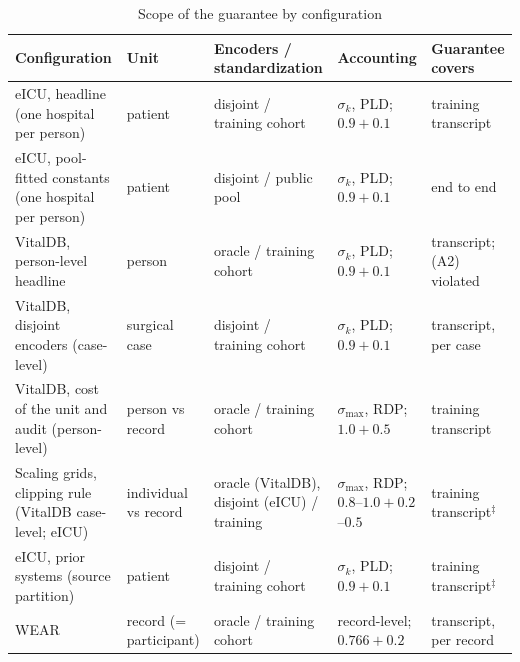 \begin{table}[!t]
\centering
\caption{Scope of the guarantee by configuration}
\label{tab:scope}
\footnotesize
\setlength{\tabcolsep}{4pt}
\begin{tabular}{>{\raggedright\arraybackslash}p{4.8cm}>{\raggedright\arraybackslash}p{2.3cm}>{\raggedright\arraybackslash}p{3.6cm}>{\raggedright\arraybackslash}p{3.3cm}>{\raggedright\arraybackslash}p{2.7cm}}
\toprule
Configuration & Unit & Encoders / standardization & Accounting & Guarantee covers \\
\midrule
eICU, headline (one hospital per person) & patient & disjoint / training cohort & $\sigma_k$, PLD; $0.9 + 0.1$ & training transcript \\
eICU, pool-fitted constants (one hospital per person) & patient & disjoint / public pool & $\sigma_k$, PLD; $0.9 + 0.1$ & end to end \\
VitalDB, person-level headline & person & oracle / training cohort & $\sigma_k$, PLD; $0.9 + 0.1$ & transcript; (A2) violated \\
VitalDB, disjoint encoders (case-level) & surgical case & disjoint / training cohort & $\sigma_k$, PLD; $0.9 + 0.1$ & transcript, per case \\
VitalDB, cost of the unit and audit (person-level) & person vs record & oracle / training cohort & $\sigma_{\max}$, RDP; $1.0 + 0.5$ & training transcript \\
Scaling grids, clipping rule (VitalDB case-level; eICU) & individual vs record & oracle (VitalDB), disjoint (eICU) / training & $\sigma_{\max}$, RDP; $0.8$--$1.0 + 0.2$--$0.5$ & training transcript$^{\ddagger}$ \\
eICU, prior systems (source partition) & patient & disjoint / training cohort & $\sigma_k$, PLD; $0.9 + 0.1$ & training transcript$^{\ddagger}$ \\
WEAR & record (= participant) & oracle / training cohort & record-level; $0.766 + 0.2$ & transcript, per record \\
\bottomrule
\end{tabular}
\end{table}

